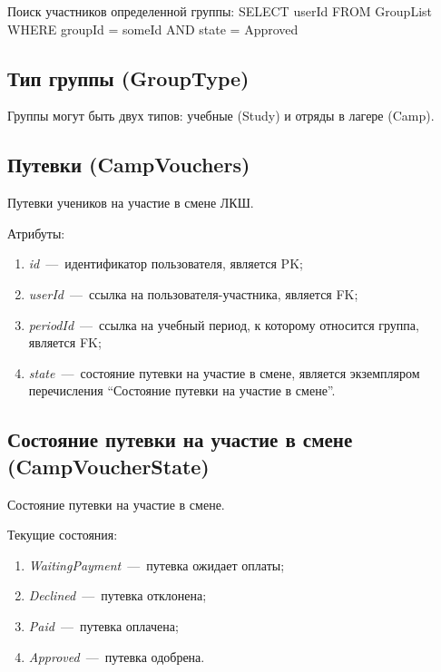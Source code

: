 \documentclass[14pt]{article}
\begin{document}
Поиск участников определенной группы: SELECT userId FROM GroupList WHERE groupId = someId AND state = Approved

\subsection{Тип группы (GroupType)}

Группы могут быть двух типов: учебные (Study) и отряды в лагере (Camp).

\subsection{Путевки (CampVouchers)}

Путевки учеников на участие в смене ЛКШ.

Атрибуты:
\begin{enumerate}
	\item \emph{id}~---~идентификатор пользователя, является PK; 
	\item \emph{userId}~---~ссылка на пользователя-участника, является FK;
	\item \emph{periodId}~---~ссылка на учебный период, к которому относится группа, является FK;
	\item \emph{state}~---~состояние путевки на участие в смене, является экземпляром перечисления ``Состояние путевки на участие в смене''. 
\end{enumerate}

\subsection{Состояние путевки на участие в смене (CampVoucherState)}

Состояние путевки на участие в смене.

Текущие состояния:

\begin{enumerate}
	\item \emph{WaitingPayment}~---~путевка ожидает оплаты;
	\item \emph{Declined}~---~путевка отклонена;
	\item \emph{Paid}~---~путевка оплачена;
	\item \emph{Approved}~---~путевка одобрена.
\end{enumerate}
\end{document}
